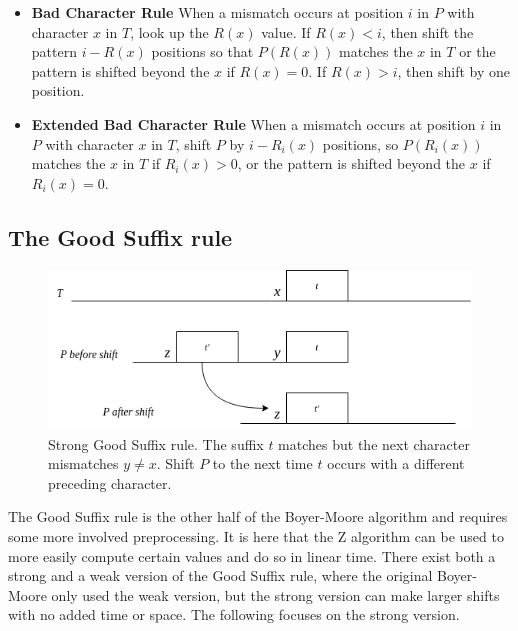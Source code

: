 \begin{itemize}
    \item[] \textbf{Bad Character Rule} When a mismatch occurs at position $i$ in $P$ with character $x$ in $T$, look up the $R(x)$ value. If $R(x)<i$, then shift the pattern $i-R(x)$ positions so that $P(R(x))$ matches the $x$ in $T$ or the pattern is shifted beyond the $x$ if $R(x)=0$. If $R(x)>i$, then shift by one position. 
    \item[] \textbf{Extended Bad Character Rule} When a mismatch occurs at position $i$ in $P$ with character $x$ in $T$, shift $P$ by $i-R_i(x)$ positions, so $P(R_i(x))$ matches the $x$ in $T$ if $R_i(x)>0$, or the pattern is shifted beyond the $x$ if $R_i(x)=0$. 
\end{itemize}

\subsection{The Good Suffix rule}

\begin{figure}[th!]
    \centering
    \includegraphics[width=\textwidth]{LaTeX/Figures/Zalg/suffixrule.png}
    \caption{Strong Good Suffix rule. The suffix $t$ matches but the next character mismatches $y\neq x$. Shift $P$ to the next time $t$ occurs with a different preceding character. }
    \label{fig:suffixrule}
\end{figure}

The Good Suffix rule is the other half of the Boyer-Moore algorithm and requires some more involved preprocessing. It is here that the Z algorithm can be used to more easily compute certain values and do so in linear time. There exist both a strong and a weak version of the Good Suffix rule, where the original Boyer-Moore only used the weak version\cite{Gusfield1997AlgorithmsOS}, but the strong version can make larger shifts with no added time or space. The following focuses on the strong version. 

